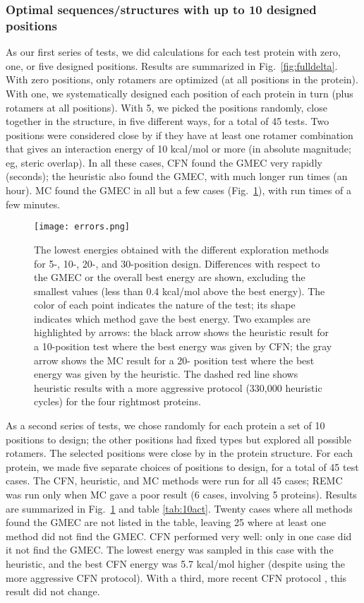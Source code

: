 \subsubsection{Optimal sequences/structures with up to 10 designed positions}
As our first series of tests, we did calculations for each test protein with zero, one, or five designed positions. Results are summarized in Fig.\ \ref{fig:fulldelta}. With zero positions, only rotamers are optimized (at all positions in the protein). With one, we systematically designed each position of each protein in turn (plus rotamers at all positions). With 5, we picked the positions randomly, close together in the structure, in five different ways, for a total of 45 tests. Two positions were considered close by if they have at least one rotamer combination that gives an interaction energy of 10 kcal/mol or more (in absolute magnitude; eg, steric overlap). In all these cases, CFN found the GMEC very rapidly (seconds); the heuristic also found the GMEC, with much longer run times (an hour). MC found the GMEC in all but a few cases (Fig.\ \ref{fig:errors}), with run times of a few minutes. 

\begin{figure}[!htbp]
  \begin{center}
    \texttt{[image: errors.png]}
  \end{center}
  \caption{The lowest energies obtained with the different exploration
methods for 5-, 10-, 20-, and 30-position design. Differences with respect
to the GMEC or the overall best energy are shown, excluding the smallest
values (less than 0.4 kcal/mol above the best energy). The color of each
point indicates the nature of the test; its shape indicates which method
gave the best energy. Two examples are highlighted by arrows: the black
arrow shows the heuristic result for a 10-position test where the best
energy was given by CFN; the gray arrow shows the MC result for a 20-
position test where the best energy was given by the heuristic. The dashed
red line shows heuristic results with a more aggressive protocol (330,000
heuristic cycles) for the four rightmost proteins.
}
      \label{fig:errors}
\end{figure}

As a second series of tests, we chose randomly for each protein a set of 10 positions to design; the other positions had fixed types but explored all possible rotamers. The selected positions were close by in the protein structure. For each protein, we made five separate choices of positions to design, for a total of 45 test cases. The CFN, heuristic, and MC methods were run for all 45 cases; REMC was run only when MC gave a poor result (6 cases, involving 5 proteins).
Results are summarized in Fig.\ \ref{fig:errors} and table \ref{tab:10act}. Twenty cases where all methods found the GMEC are not listed in the table, leaving 25 where at least one method did not find the GMEC. CFN performed very well: only in one case did it not find the GMEC. The lowest energy was sampled in this case with the heuristic, and the best CFN energy was 5.7 kcal/mol higher (despite using the more aggressive CFN protocol). With a third, more recent CFN protocol \cite{Simoncini15}, this result did not change. 

